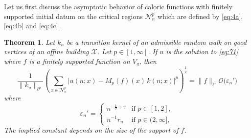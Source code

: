 \documentclass[11pt]{amsart}
\newcommand{\calO}{\mathcal{O}}
\newcommand{\scrX}{\mathscr{X}}
\newcommand{\scrN}{\mathscr{N}}
\theoremstyle{plain}
\newcounter{thm}
\newtheorem{theorem}{Theorem}[section]
\theoremstyle{definition}
\numberwithin{equation}{section}
\begin{document}
Let us first discuss the asymptotic behavior of caloric functions with finitely supported initial datum on the critical regions
$\scrN_n^p$ which are defined by \eqref{eq:4a}, \eqref{eq:4b} and \eqref{eq:4c}.
\begin{theorem}
	\label{thm:7}
	Let $k_n$ be a transition kernel of an admissible random walk on good vertices of an affine building $\scrX$.
	Let $p \in [1, \infty]$. If $u$ is the solution to \eqref{eq:71} where $f$ is a finitely supported function on $V_g$,
	then
	\[
		\frac{1}{\|k_n\|_{\ell^p}}
		\left(
		\sum_{x \in \scrN_n^p} 
		\big|u(n; x) - M_p(f) (x)\, k(n; x) \big|^p
		\right)^{\frac{1}{p}}
		=
		\|f\|_{\ell^1}
		\calO\big( \varepsilon_n'\big)
	\] 
	where
	\[
		\varepsilon_n' =
		\begin{cases}
			n^{-\frac{1}{2} + \gamma} &\text{if } p \in [1, 2], \\
			n^{-1} r_n &\text{if } p \in (2, \infty],
		\end{cases}
	\]
	The implied constant depends on the size of the support of $f$.
\end{theorem}
\end{document}
